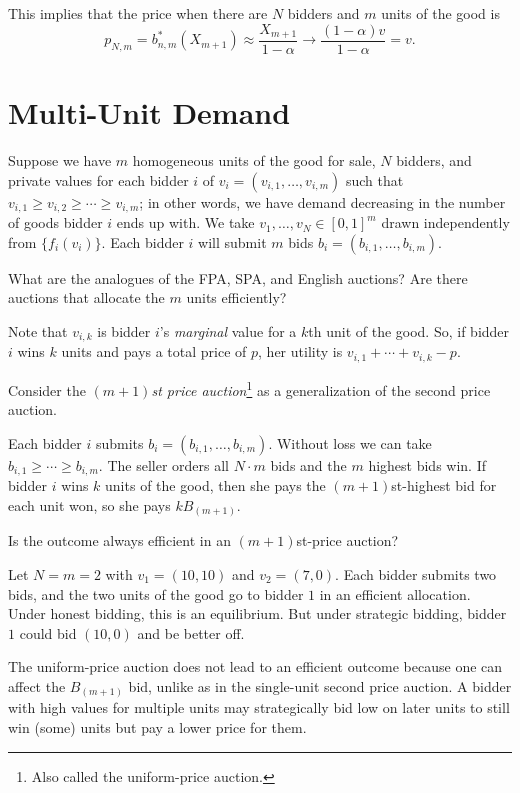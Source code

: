 This implies that the price when there are $N$ bidders and $m$ units of the good is \[
	p_{N,m} = b_{n,m}^*(X_{m+1}) \approx \frac{X_{m+1}}{1-\alpha}\to \frac{(1-\alpha)v}{1-\alpha} = v
.\] 

\section{Multi-Unit Demand}
Suppose we have $m$ homogeneous units of the good for sale, $N$ bidders, and private values for each bidder $i$ of $v_i = \left( v_{i,1},\ldots,v_{i,m} \right)$ such that $v_{i, 1} \ge v_{i, 2}\ge \cdots \ge v_{i,m}$; in other words, we have demand decreasing in the number of goods bidder $i$ ends up with. We take $v_1,\ldots,v_N \in [0,1]^m$ drawn independently from $\{f_i(v_i)\}$. Each bidder $i$ will submit $m$ bids $b_i = \left( b_{i,1},\ldots,b_{i,m} \right)$.

What are the analogues of the FPA, SPA, and English auctions? Are there auctions that allocate the $m$ units efficiently?

Note that $v_{i,k}$ is bidder $i$'s \emph{marginal} value for a $k$th unit of the good. So, if bidder $i$ wins $k$ units and pays a total price of $p$, her utility is $v_{i,1}+ \cdots + v_{i,k}- p$.

Consider the \emph{$(m+1)$st price auction}\footnote{Also called the uniform-price auction.} as a generalization of the second price auction. 

\begin{definition}
	Each bidder $i$ submits $b_i = (b_{i,1},\ldots,b_{i,m})$. Without loss we can take $b_{i,1} \ge \cdots \ge b_{i,m}$. The seller orders all $N\cdot m$ bids and the $m$ highest bids win. If bidder $i$ wins $k$ units of the good, then she pays the $(m+1)$st-highest bid for each unit won, so she pays $k B_{(m+1)}$.
\end{definition}

Is the outcome always efficient in an $(m+1)$st-price auction?

\begin{example}	Let $N = m =2$ with $v_1 = (10,10)$ and $v_2 = (7,0)$. Each bidder submits two bids, and the two units of the good go to bidder $1$ in an efficient allocation.
	Under honest bidding, this is an equilibrium. But under strategic bidding, bidder $1$ could bid $(10,0)$ and be better off.

	The uniform-price auction does not lead to an efficient outcome because one can affect the $B_{(m+1)}$ bid, unlike as in the single-unit second price auction. A bidder with high values for multiple units may strategically bid low on later units to still win (some) units but pay a lower price for them.
\end{example}

